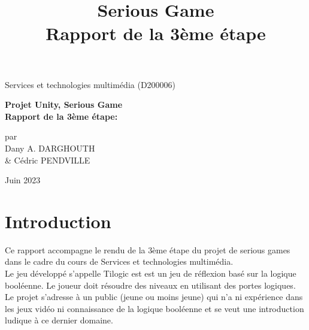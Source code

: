 \documentclass{article}
\title{Serious Game\\Rapport de la 3ème étape}
\author{}
\date{}
\begin{document}
\begin{titlepage}
	\begin{center}

		\vspace*{2cm}
		
		{\Large Services et technologies multimédia (D200006)} %
		
		\vspace{5cm}
		{\huge\textbf{Projet Unity, Serious Game\\Rapport de la 3ème étape:\\ }}
		
		\vspace{4cm}
		{par\\\large Dany A. DARGHOUTH \\\& Cédric PENDVILLE}
		\vfill
		
		Juin 2023
		
		
		\end{center}
\end{titlepage}

\maketitle
\tableofcontents
\newpage

\section{Introduction}
Ce rapport accompagne le rendu de la 3ème étape du projet de serious games dans le cadre du cours de Services et technologies multimédia.\\

Le jeu développé s'appelle Tilogic est est un jeu de réflexion basé sur la logique booléenne. Le joueur doit résoudre des niveaux en utilisant des portes logiques. Le projet s'adresse à un public (jeune ou moins jeune) qui n'a ni expérience dans les jeux vidéo ni connaissance de la logique booléenne et se veut une introduction ludique à ce dernier domaine.\\
\end{document}
